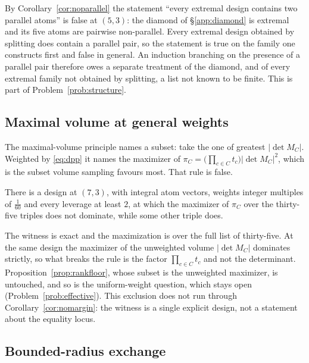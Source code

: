 By Corollary~\ref{cor:noparallel} the statement ``every extremal design
contains two parallel atoms'' is false at $(5,3)$: the diamond of
\S\ref{app:diamond} is extremal and its five atoms are pairwise non-parallel.
Every extremal design obtained by splitting does contain a parallel pair, so
the statement is true on the family one constructs first and false in general.
An induction branching on the presence of a parallel pair therefore owes a
separate treatment of the diamond, and of every extremal family not obtained by
splitting, a list not known to be finite.  This is part of
Problem~\ref{prob:structure}.

\subsection{Maximal volume at general weights}\label{app:volume}

\sloppy

The maximal-volume principle \cite{GT2001} names a subset: take the one of
greatest $\lvert\det M_C\rvert$.  Weighted by \eqref{eq:dpp} it names the
maximizer of $\pi_C=\bigl(\prod_{c\in C}t_c\bigr)\lvert\det M_C\rvert^2$,
which is the subset volume sampling favours most.  That rule is false.

\begin{proposition}[Lean]\label{prop:volumefails}
There is a design at $(7,3)$, with integral atom vectors, weights integer
multiples of $\tfrac1{60}$ and every leverage at least $2$, at which the
maximizer of $\pi_C$ over the thirty-five triples does not dominate, while
some other triple does.
\end{proposition}

The witness is exact and the maximization is over the full list of
thirty-five.  At the same design the maximizer of the unweighted
volume $\lvert\det M_C\rvert$ dominates strictly, so what breaks the rule is
the factor $\prod_{c\in C}t_c$ and not the determinant.
Proposition~\ref{prop:rankfloor}, whose subset is the unweighted maximizer,
is untouched, and so is the uniform-weight question, which stays open
(Problem~\ref{prob:effective}).  This exclusion does not run through
Corollary~\ref{cor:nomargin}: the witness is a single explicit design, not a
statement about the equality locus.

\subsection{Bounded-radius exchange}\label{app:exchange}

